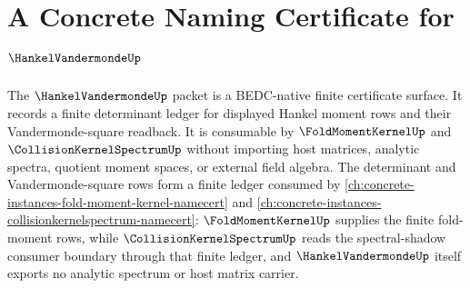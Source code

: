 \chapter{A Concrete Naming Certificate for $\HankelVandermondeUp$}
\label{ch:concrete-instances-hankelvandermonde-namecert}

The $\HankelVandermondeUp$ packet is a BEDC-native finite certificate surface. It records a finite determinant ledger for displayed Hankel moment rows and their Vandermonde-square readback. It is consumable by $\FoldMomentKernelUp$ and $\CollisionKernelSpectrumUp$ without importing host matrices, analytic spectra, quotient moment spaces, or external field algebra.
The determinant and Vandermonde-square rows form a finite ledger consumed by \autoref{ch:concrete-instances-fold-moment-kernel-namecert} and \autoref{ch:concrete-instances-collisionkernelspectrum-namecert}: $\FoldMomentKernelUp$ supplies the finite fold-moment rows, while $\CollisionKernelSpectrumUp$ reads the spectral-shadow consumer boundary through that finite ledger, and $\HankelVandermondeUp$ itself exports no analytic spectrum or host matrix carrier.

